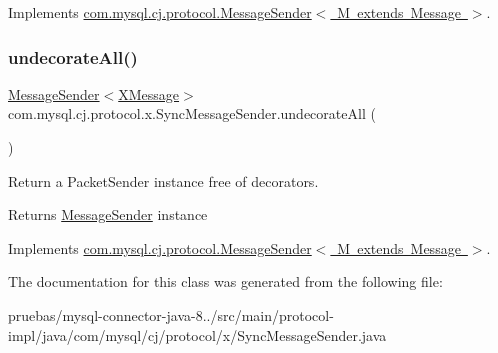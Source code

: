 Implements \mbox{\hyperlink{interfacecom_1_1mysql_1_1cj_1_1protocol_1_1_message_sender_a3a352bf35ad98dc6cea7c1f4ac9480da}{com.\+mysql.\+cj.\+protocol.\+Message\+Sender$<$ M extends Message $>$}}.

\mbox{\label{classcom_1_1mysql_1_1cj_1_1protocol_1_1x_1_1_sync_message_sender_a7228daf021acf6d8505108645317825d}} 
\subsubsection{\texorpdfstring{undecorate\+All()}{undecorateAll()}}
{\footnotesize\ttfamily \mbox{\hyperlink{interfacecom_1_1mysql_1_1cj_1_1protocol_1_1_message_sender}{Message\+Sender}}$<$\mbox{\hyperlink{classcom_1_1mysql_1_1cj_1_1protocol_1_1x_1_1_x_message}{X\+Message}}$>$ com.\+mysql.\+cj.\+protocol.\+x.\+Sync\+Message\+Sender.\+undecorate\+All (\begin{DoxyParamCaption}{ }\end{DoxyParamCaption})}

Return a Packet\+Sender instance free of decorators.

\begin{DoxyReturn}{Returns}
\mbox{\hyperlink{interfacecom_1_1mysql_1_1cj_1_1protocol_1_1_message_sender}{Message\+Sender}} instance 
\end{DoxyReturn}


Implements \mbox{\hyperlink{interfacecom_1_1mysql_1_1cj_1_1protocol_1_1_message_sender_a8066931f03c2fa9cc705716fa10a4517}{com.\+mysql.\+cj.\+protocol.\+Message\+Sender$<$ M extends Message $>$}}.



The documentation for this class was generated from the following file\+:\begin{DoxyCompactItemize}
\item 
pruebas/mysql-\/connector-\/java-\/8../src/main/protocol-\/impl/java/com/mysql/cj/protocol/x/Sync\+Message\+Sender.\+java\end{DoxyCompactItemize}
